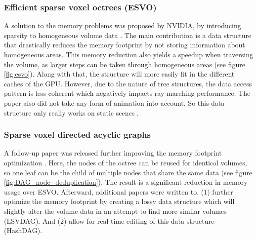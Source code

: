 \subsubsection{Efficient sparse voxel octrees (ESVO)} \label{related_work:voxel_data_structures:esvo}
A solution to the memory problems was proposed by NVIDIA, by introducing sparsity to homogeneous volume data \cite{laine2010efficient}. The main contribution is a data structure that drastically reduces the memory footprint by not storing information about homogeneous areas. This memory reduction also yields a speedup when traversing the volume, as larger steps can be taken through homogeneous areas (see figure \ref{fig:esvo}). Along with that, the structure will more easily fit in the different caches of the GPU. However, due to the nature of tree structures, the data access pattern is less coherent which negatively impacts ray marching performance. The paper also did not take any form of animation into account. So this data structure only really works on static scenes \cite{JohnLinPerfectEngine}.


\subsubsection{Sparse voxel directed acyclic graphs} \label{related_work:voxel_data_structures:svdag}
A follow-up paper was released further improving the memory footprint optimization \cite{kampe2013high}. Here, the nodes of the octree can be reused for identical volumes, so one leaf can be the child of multiple nodes that share the same data (see figure \ref{fig:DAG_node_deduplication}). The result is a significant reduction in memory usage over ESVO. Afterward, additional papers were written to, (1) further optimize the memory footprint by creating a lossy data structure which will slightly alter the volume data in an attempt to find more similar volumes \cite{van2020lossy} (LSVDAG). And (2) allow for real-time editing of this data structure \cite{careil2020interactively} (HashDAG).

